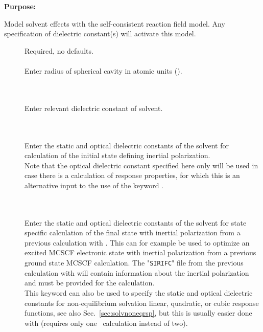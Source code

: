 {\bf Purpose:}

Model solvent effects with the self-consistent
reaction field model.
Any specification of dielectric constant(s)
will activate this model.

\begin{description}
\item[]
  Required, no defaults.\\
  \\
  Enter radius of spherical cavity in atomic units (\bohr{}).

\item[] \ \\
  \\
  Enter relevant dielectric constant of solvent.

\item[] \ \\
  \\
  Enter the static and optical dielectric constants of the solvent
  for calculation of the initial state defining inertial polarization. \\
  Note that the optical dielectric constant specified here
  only will be used in case there is a calculation of response
  properties, for which this is an alternative input to the use of the
  keyword .

\item[] \ \\
  \\
  Enter the static and optical dielectric constants of the solvent
  for state specific calculation of the final state with inertial polarization
  from a previous calculation with . 
  This can for example be used to optimize an excited MCSCF electronic state
  with inertial polarization from a previous ground state MCSCF calculation.
  The "\verb|SIRIFC|" file from the previous calculation with 
  will contain information about the inertial polarization and must be provided for the
   calculation. \\
  This keyword can also be used to specify the static and optical dielectric constants
  for non-equilibrium solvation linear, quadratic, or cubic response functions,
  see also Sec.~\ref{sec:solvnoneqrsp}, but this is usually easier done with
   (requires only one \dalton\ calculation instead of two).


\end{description}
